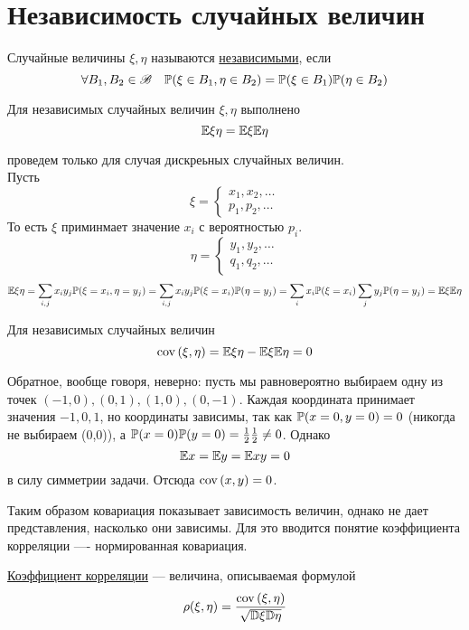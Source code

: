 \documentclass[../TV&MS.tex]{subfiles}
\begin{document}
    
\section{Независимость случайных величин}
\begin{Def}
	Случайные величины $\xi, \eta$ называются \underline{независимыми}, если 
	 $$ \forall B_1, B_2 \in \mathscr{B} \quad \mathbb{P}(\xi \in B_1, \eta \in B_2) = \mathbb{P}(\xi \in B_1)\mathbb{P}(\eta \in B_2) $$
\end{Def}

\begin{St}
Для независимых случайных величин $\xi, \eta$ выполнено
$$\mathbb{E}\xi\eta = \mathbb{E}\xi\mathbb{E}\eta$$
\end{St}
\begin{Proof}
проведем только для случая дискреьных случайных величин.\\
Пусть 
\[
   	\xi = 
  	\begin{cases}
  		x_1, x_2, \ldots \\
  		p_1, p_2, \ldots
  	\end{cases}
  \]
  То есть $\xi$ приминмает значение $x_i$ с вероятностью $p_i$.
  \[
   	\eta = 
  	\begin{cases}
  		y_1, y_2, \ldots \\
  		q_1, q_2, \ldots
  	\end{cases}
  \]
  $$\mathbb{E}\xi\eta=\sum\limits_{i,j} x_iy_j\mathbb{P}(\xi=x_i, \eta=y_j) = \sum\limits_{i,j} x_iy_j\mathbb{P}(\xi=x_i)\mathbb{P}(\eta=y_j) =  \sum\limits_{i} x_i\mathbb{P}(\xi=x_i)\sum\limits_j y_j\mathbb{P}(\eta=y_j) = \mathbb{E}\xi\mathbb{E}\eta$$
\end{Proof}

Для независимых случайных величин
$${\rm cov \,}(\xi,\eta) = \mathbb{E}\xi\eta - \mathbb{E}\xi\mathbb{E}\eta = 0$$

Обратное, вообще говоря, неверно: пусть мы равновероятно выбираем одну из точек $(-1, 0), (0, 1), (1, 0), (0, -1)$. Каждая координата принимает значения $-1, 0, 1$, но координаты зависимы, так как $\mathbb{P}(x=0,  y=0) = 0$ (никогда не выбираем (0,0)), а $\mathbb{P}(x=0)\mathbb{P}(y=0) = \frac12\frac12 \not=0$. Однако
$$\mathbb{E} x = \mathbb{E} y = \mathbb{E} xy = 0$$ в силу симметрии задачи. Отсюда ${\rm cov \,}(x,y) = 0$.

Таким образом ковариация показывает зависимость величин, однако не дает представления, насколько они зависимы. Для это вводится понятие коэффициента корреляции ---- нормированная ковариация.

\begin{Def}
\underline{Коэффициент корреляции} --- величина, описываемая формулой
$$\rho(\xi, \eta) = \frac{{\rm cov \,}(\xi, \eta)}{\sqrt{\mathbb{D}\xi\mathbb{D}\eta}}$$
\end{Def}
\end{document}
